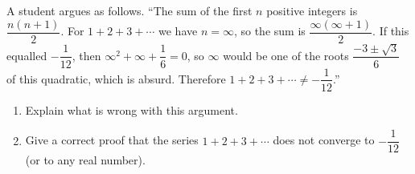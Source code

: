 A student argues as follows. ``The sum of the first $n$ positive integers is $\dfrac{n(n+1)}{2}$. For $1+2+3+\cdots$ we have $n=\infty$, so the sum is $\dfrac{\infty(\infty+1)}{2}$. If this equalled $-\dfrac{1}{12}$, then $\infty^2+\infty+\dfrac{1}{6}=0$, so $\infty$ would be one of the roots $\dfrac{-3\pm\sqrt3}{6}$ of this quadratic, which is absurd. Therefore $1+2+3+\cdots\ne-\dfrac{1}{12}$.''
\begin{enumerate}
\item[(a)] Explain what is wrong with this argument.
\item[(b)] Give a correct proof that the series $1+2+3+\cdots$ does not converge to $-\dfrac{1}{12}$ (or to any real number).
\end{enumerate}
